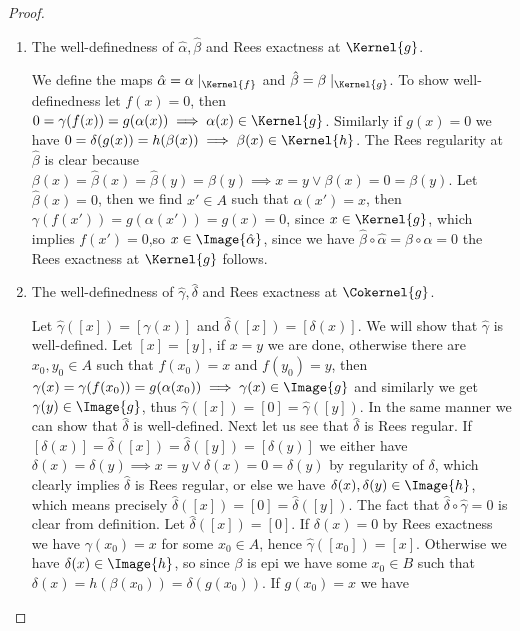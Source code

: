 \begin{proof}[Proof]
    \begin{enumerate}
        \item The well-definedness of $\hat{\alpha},\hat{\beta}$ and Rees exactness at $\Kernel{g}$.\par
        We define the maps $\hat{\alpha}=\alpha\mid_{\Kernel{f}}$ and $\hat{\beta}=\beta\mid_{\Kernel{g}}$. To show 
        well-definedness let $f(x)=0$, then $0=\gamma(f(x))=g(\alpha(x)) \implies \alpha(x)\in\Kernel{g}$. Similarly if 
        $g(x)=0$ we have $0=\delta(g(x))=h(\beta(x)) \implies \beta(x)\in\Kernel{h}$. The Rees regularity at $\hat{\beta}$ is clear 
        because $\beta(x)=\hat{\beta}(x)=\hat{\beta}(y)=\beta(y)\implies x=y \lor \beta(x)=0=\beta(y)$. Let $\hat{\beta}(x)=0$, then
        we find $x'\in A$ such that $\alpha(x')=x$, then $\gamma(f(x'))=g(\alpha(x'))=g(x)=0$, since $x\in\Kernel{g}$, which implies
        $f(x')=0$,so $x\in\Image{\hat{\alpha}}$, since we have $\hat{\beta}\circ\hat{\alpha}=\beta\circ\alpha = 0$ the Rees exactness at $\Kernel{g}$ follows.
        \item The well-definedness of $\hat{\gamma},\hat{\delta}$ and Rees exactness at $\Cokernel{g}$.\par
        Let $\hat{\gamma}([x])=[\gamma(x)]$ and $\hat{\delta}([x])=[\delta(x)]$. We will show that $\hat{\gamma}$ is well-defined. 
        Let $[x]=[y]$, if $x=y$ we are done, otherwise there are $x_0,y_0\in A$ such that $f(x_0)=x$ and $f(y_0)=y$, then 
        $\gamma(x)=\gamma(f(x_0))=g(\alpha(x_0)) \implies \gamma(x)\in\Image{g}$ and similarly we get $\gamma(y)\in\Image{g}$, thus 
        $\hat{\gamma}([x])=[0]=\hat{\gamma}([y])$. In the same manner we can show that $\hat{\delta}$ is well-defined. Next let us
        see that $\hat{\delta}$ is Rees regular. If $[\delta(x)]=\hat{\delta}([x])=\hat{\delta}([y])=[\delta(y)]$ we either have 
        $\delta(x)=\delta(y) \implies x=y\lor \delta(x)=0=\delta(y)$ by regularity of $\delta$, which clearly implies $\hat{\delta}$ is Rees regular, 
        or else we have $\delta(x),\delta(y)\in\Image{h}$, which means precisely $\hat{\delta}([x])=[0]=\hat{\delta}([y])$. The fact 
        that $\hat{\delta}\circ\hat{\gamma}=0$ is clear from definition. Let $\hat{\delta}([x])=[0]$. If $\delta(x)=0$ by Rees exactness 
        we have $\gamma(x_0)=x$ for some $x_0\in A$, hence $\hat{\gamma}([x_0])=[x]$. Otherwise we have $\delta(x)\in\Image{h}$, so 
        since $\beta$ is epi we have some $x_0\in B$ such that $\delta(x)=h(\beta(x_0))=\delta(g(x_0))$. If $g(x_0)=x$ we have 

\end{enumerate}
\end{proof}
